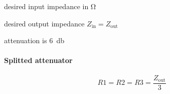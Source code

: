 \documentclass[varwidth,convert={density=300,size=800x800,outext=.png}]{standalone}
\newcommand{\Zin}{Z_\mathrm{in}}
\newcommand{\Zout}{Z_\mathrm{out}}
\begin{document}
\begin{description}[labelindent=0pt,labelsep=10pt]
\item[$\Zin$] desired input impedance in \si{\ohm}
\item[$\Zout$] desired output impedance $\Zin=\Zout$
\item[$a$] attenuation is \SI{6}{\decibel}
\end{description}

\paragraph{Splitted attenuator}
\[R1 = R2 = R3 = \frac{\Zout}{3}\]
\end{document}
